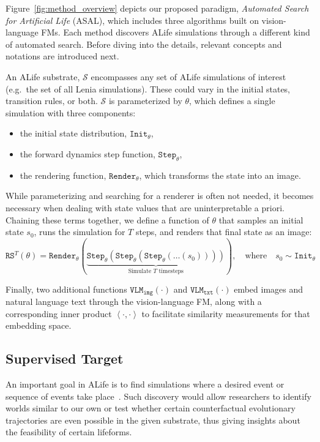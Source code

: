 \documentclass{article}
\begin{document}
Figure~\ref{fig:method_overview} depicts our proposed paradigm, \textit{Automated Search for Artificial Life} (ASAL), which includes three algorithms built on vision-language FMs.
Each method discovers ALife simulations through a different kind of automated search.
Before diving into the details, relevant concepts and notations are introduced next.

An ALife substrate, $\mathcal{S}$ encompasses any set of ALife simulations of interest (e.g.\ the set of all Lenia simulations).
These could vary in the initial states, transition rules, or both.
$\mathcal{S}$ is parameterized by $\theta$, which defines a single simulation with three components:
\begin{itemize}
    \item the initial state distribution, $\texttt{Init}_\theta$,
    \item the forward dynamics step function, $\texttt{Step}_\theta$,
    \item the rendering function, $\texttt{Render}_\theta$, which transforms the state into an image.
\end{itemize}
While parameterizing and searching for a renderer is often not needed, it becomes necessary when dealing with state values that are uninterpretable a priori.
Chaining these terms together, we define a function of $\theta$ that samples an initial state $s_0$, runs the simulation for $T$ steps, and renders that final state as an image:
\begin{equation}
\texttt{RS}^T(\theta)
=
\texttt{Render}_\theta\left(
\underbrace{
\texttt{Step}_\theta(\texttt{Step}_\theta(\texttt{Step}_\theta(\dots (s_0))))
}_{\text{Simulate } T \text{ timesteps}}
\right)
,\quad \text{where} \quad
s_0\sim\texttt{Init}_\theta
\end{equation}

Finally, two additional functions $\texttt{VLM}_\texttt{img}(\cdot)$ and $\texttt{VLM}_\texttt{txt}(\cdot)$ embed images and natural language text through the vision-language FM, along with a corresponding inner product $\left<\cdot, \cdot\right>$ to facilitate similarity measurements for that embedding space.




\subsection{Supervised Target}
An important goal in ALife is to find simulations where a desired event or sequence of events take place~\citep{bedau2000open}.
Such discovery would allow researchers to identify worlds similar to our own or test whether certain counterfactual evolutionary trajectories are even possible in the given substrate, thus giving insights about the feasibility of certain lifeforms.
\end{document}

